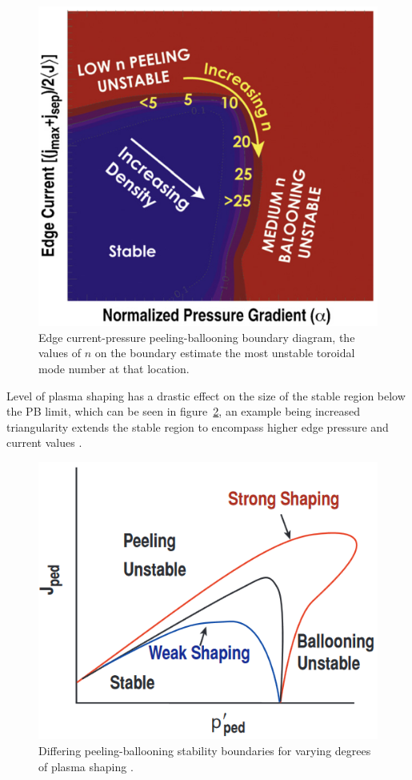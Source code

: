 \documentclass[12pt]{article}  %
\begin{document}
\begin{figure}
\includegraphics[scale=0.5]{Figures/PBmodenumbers.png}
\centering
\caption{Edge current-pressure peeling-ballooning boundary diagram, the values of $n$ on the boundary estimate the most unstable toroidal mode number at that location\cite{Wade2009}.}\label{fig:PBmodenumbers}
\end{figure}

Level of plasma shaping has a drastic effect on the size of the stable region below the PB limit, which can be seen in figure~\ref{fig:PBshaping}, an example being increased triangularity extends the stable region to encompass higher edge pressure and current values \cite{Lang2013}.

\begin{figure}
\includegraphics[scale=0.6]{Figures/PBshaping.png}
\centering
\caption{Differing peeling-ballooning stability boundaries for varying degrees of plasma shaping \cite{Snyder2004}.}\label{fig:PBshaping}
\end{figure}
\end{document}
